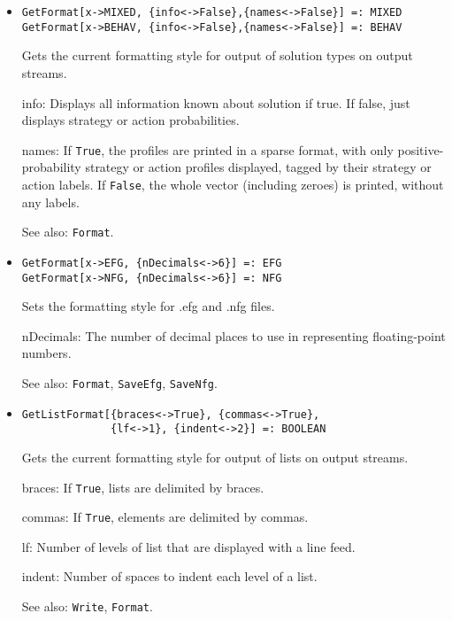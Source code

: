 \begin{itemize}
\item{}
\protect \large \begin{verbatim}
GetFormat[x->MIXED, {info<->False},{names<->False}] =: MIXED
GetFormat[x->BEHAV, {info<->False},{names<->False}] =: BEHAV
\end{verbatim} \normalsize

\bd Gets the current formatting style for output of solution types on
output streams.  
\bd
\item [info:] Displays all information known about solution if true. If false, just displays strategy or action probabilities.  
\item [names:] If \verb+True+, the profiles are printed in a sparse format,
with only positive-probability strategy or action profiles displayed, tagged
by their strategy or action labels.  If \verb+False+, the whole vector
(including zeroes) is printed, without any labels.
\ed
\item [See also:] \verb+Format+.
\ed

\item{}
\protect \large \begin{verbatim}
GetFormat[x->EFG, {nDecimals<->6}] =: EFG
GetFormat[x->NFG, {nDecimals<->6}] =: NFG
\end{verbatim} \normalsize

\bd
Sets the formatting style for .efg and .nfg files.
\bd
\item [nDecimals:] The number of decimal places to use in representing
floating-point numbers.
\ed
\item [See also:] \verb+Format+, \verb+SaveEfg+, \verb+SaveNfg+.
\ed

\item{}
\protect \large \begin{verbatim}
GetListFormat[{braces<->True}, {commas<->True},
              {lf<->1}, {indent<->2}] =: BOOLEAN 
\end{verbatim} \normalsize

\bd
Gets the current formatting style for output of lists on output streams.
\bd
\item [braces:] If \verb+True+, lists are delimited by braces.
\item [commas:] If \verb+True+, elements are delimited by commas.
\item [lf:] Number of levels of list that are displayed with a line feed.
\item [indent:] Number of spaces to indent each level of a list.
\ed
\item [See also:] \verb+Write+, \verb+Format+.
\ed



\end{itemize}
